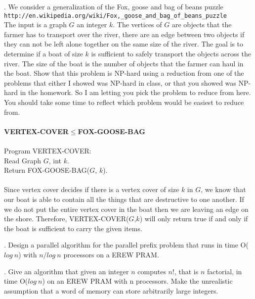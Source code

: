 \documentclass[10pt]{article}
\newcommand{\tab}{\hspace*{2em}}
\begin{document}
. We consider a generalization of the Fox, goose and bag of beans puzzle
\verb=http://en.wikipedia.org/wiki/Fox,_goose_and_bag_of_beans_puzzle= \\
The input is a graph $G$ an integer $k$. The vertices of $G$ are objects that the farmer has to transport
over the river, there are an edge between two objects if they can not be left alone together on the same
size of the river. The goal is to determine if a boat of size $k$ is sufficient to safely transport the objects
across the river. The size of the boat is the number of objects that the farmer can haul in the boat.
Show that this problem is NP-hard using a reduction from one of the problems that either I showed
was NP-hard in class, or that you showed was NP-hard in the homework. So I am letting you pick the
problem to reduce from here. You should take some time to reflect which problem would be easiest to
reduce from.\\
\\
\textbf{VERTEX-COVER}$\leq$\textbf{FOX-GOOSE-BAG}\\
\\
Program VERTEX-COVER:\\
\tab Read Graph $G$, int $k$.\\
\tab Return FOX-GOOSE-BAG($G$, $k$).\\
\\
Since vertex cover decides if there is a vertex cover of size $k$ in $G$, we know that 
our boat is able to contain all the things that are destructive to one another. If we do
not put the entire vertex cover in the boat then we are leaving an edge on the shore. Therefore,
VERTEX-COVER($G$,$k$) will only return true if and only if the boat is sufficient to carry the given
items. 

. Design a parallel algorithm for the parallel prefix problem that runs in time O($log~n$) with $n/log~n$
processors on a EREW PRAM.

. Give an algorithm that given an integer $n$ computes $n!$, that is $n$ factorial, in time O($log~n$) on an
EREW PRAM with n processors. Make the unrealistic assumption that a word of memory can store
arbitrarily large integers.
\end{document}

